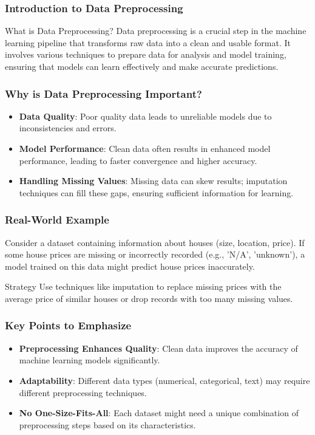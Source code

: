 \documentclass[aspectratio=169]{beamer}
\begin{document}
\frame{\titlepage}

\begin{frame}[fragile]
    \frametitle{Introduction to Data Preprocessing}
    \begin{block}{What is Data Preprocessing?}
        Data preprocessing is a crucial step in the machine learning pipeline that transforms raw data into a clean and usable format. It involves various techniques to prepare data for analysis and model training, ensuring that models can learn effectively and make accurate predictions.
    \end{block}
\end{frame}

\begin{frame}[fragile]
    \frametitle{Why is Data Preprocessing Important?}
    \begin{itemize}
        \item \textbf{Data Quality}: Poor quality data leads to unreliable models due to inconsistencies and errors.
        \item \textbf{Model Performance}: Clean data often results in enhanced model performance, leading to faster convergence and higher accuracy.
        \item \textbf{Handling Missing Values}: Missing data can skew results; imputation techniques can fill these gaps, ensuring sufficient information for learning.
    \end{itemize}
\end{frame}

\begin{frame}[fragile]
    \frametitle{Real-World Example}
    Consider a dataset containing information about houses (size, location, price). If some house prices are missing or incorrectly recorded (e.g., 'N/A', 'unknown'), a model trained on this data might predict house prices inaccurately. 
    \begin{block}{Strategy}
        Use techniques like imputation to replace missing prices with the average price of similar houses or drop records with too many missing values.
    \end{block}
\end{frame}

\begin{frame}[fragile]
    \frametitle{Key Points to Emphasize}
    \begin{itemize}
        \item \textbf{Preprocessing Enhances Quality}: Clean data improves the accuracy of machine learning models significantly.
        \item \textbf{Adaptability}: Different data types (numerical, categorical, text) may require different preprocessing techniques.
        \item \textbf{No One-Size-Fits-All}: Each dataset might need a unique combination of preprocessing steps based on its characteristics.
    \end{itemize}
\end{frame}
\end{document}
